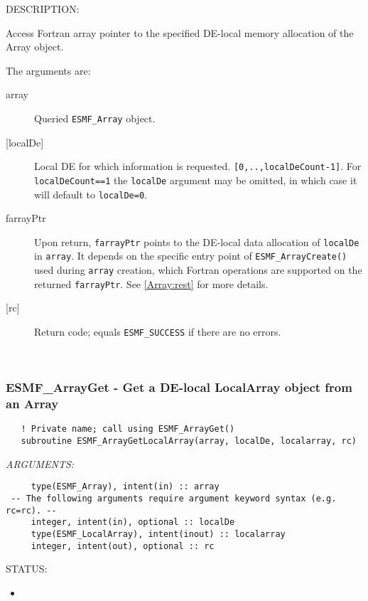 {\sf DESCRIPTION:\\ }

 
   Access Fortran array pointer to the specified DE-local memory allocation of 
   the Array object. 
   
   The arguments are: 
   \begin{description} 
   \item[array] 
   Queried {\tt ESMF\_Array} object. 
   \item[{[localDe]}] 
   Local DE for which information is requested. {\tt [0,..,localDeCount-1]}. 
   For {\tt localDeCount==1} the {\tt localDe} argument may be omitted, 
   in which case it will default to {\tt localDe=0}. 
   \item[farrayPtr] 
   Upon return, {\tt farrayPtr} points to the DE-local data allocation of 
   {\tt localDe} in {\tt array}. It depends on the specific entry point 
   of {\tt ESMF\_ArrayCreate()} used during {\tt array} creation, which 
   Fortran operations are supported on the returned {\tt farrayPtr}. See 
   \ref{Array:rest} for more details. 
   \item[{[rc]}] 
   Return code; equals {\tt ESMF\_SUCCESS} if there are no errors. 
   \end{description} 
    
 
\mbox{}\hrulefill\ 
 
\subsubsection [ESMF\_ArrayGet] {ESMF\_ArrayGet - Get a DE-local LocalArray object from an Array}


\begin{verbatim}   ! Private name; call using ESMF_ArrayGet()
   subroutine ESMF_ArrayGetLocalArray(array, localDe, localarray, rc)\end{verbatim}{\em ARGUMENTS:}
\begin{verbatim}     type(ESMF_Array), intent(in) :: array
 -- The following arguments require argument keyword syntax (e.g. rc=rc). --
     integer, intent(in), optional :: localDe
     type(ESMF_LocalArray), intent(inout) :: localarray
     integer, intent(out), optional :: rc\end{verbatim}
{\sf STATUS:}
   \begin{itemize}
   \item{}
   \end{itemize}
  
